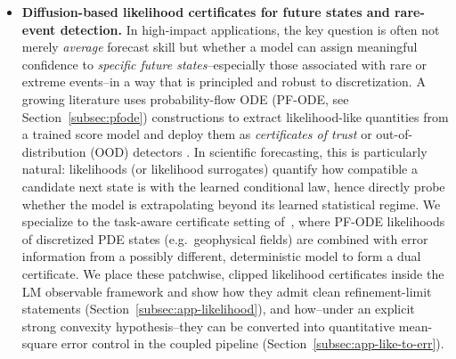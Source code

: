 \documentclass{article}
\numberwithin{equation}{section}
\theoremstyle{plain}
\theoremstyle{definition}
\theoremstyle{remark}
\begin{document}
\begin{itemize}
    \item \textbf{Diffusion-based likelihood certificates for future states and rare-event detection.}
    In high-impact applications, the key question is often not merely \emph{average} forecast skill but whether a model
    can assign meaningful confidence to \emph{specific future states}--especially those associated with rare or
    extreme events--in a way that is principled and robust to discretization.
    A growing literature uses probability-flow ODE (PF-ODE, see Section~\ref{subsec:pfode}) constructions to extract likelihood-like quantities from a
    trained score model and deploy them as \emph{certificates of trust} or out-of-distribution (OOD) detectors
    \cite{heng2024out,abdi2025out,jarve2025probability,graber2025out}.
    In scientific forecasting, this is particularly natural: likelihoods (or likelihood surrogates) quantify how
    compatible a candidate next state is with the learned conditional law, hence directly probe whether the model is
    extrapolating beyond its learned statistical regime.
    We specialize to the task-aware certificate setting of~\cite{raonic2025towards}, where PF-ODE likelihoods of
    discretized PDE states (e.g.\ geophysical fields) are combined with error information from a possibly different,
    deterministic model to form a dual certificate. We place these patchwise, clipped likelihood certificates inside the
    LM observable framework and show how they admit clean refinement-limit statements
    (Section~\ref{subsec:app-likelihood}), and how--under an explicit strong convexity hypothesis--they can be converted into
    quantitative mean-square error control in the coupled pipeline (Section~\ref{subsec:app-like-to-err}).


\end{itemize}
\end{document}
